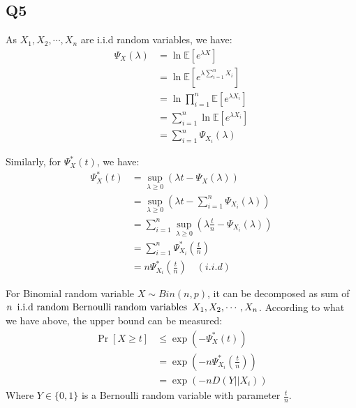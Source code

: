 \documentclass[a4paper, 12pt, titlepage]{article}
\begin{document}
\subsection{Q5}
As $X_1, X_2, \cdots, X_n$ are i.i.d random variables, we have:
\begin{equation}
    \begin{aligned}
        \Psi_{X}(\lambda) &= \ln \mathbb E \left[ e^{\lambda X} \right] \\
                           &= \ln \mathbb E \left[ e^{\lambda \sum_{i = 1}^{n} X_{i}} \right] \\
                           &= \ln \prod_{i = 1}^{n} \mathbb E \left[ e^{\lambda X_{i} } \right] \\
                           &= \sum_{i = 1}^{n} \ln \mathbb E \left[ e^{\lambda X_{i} } \right] \\
                           &= \sum_{i = 1}^{n} \Psi_{X_{i}}(\lambda)
    \end{aligned}
\end{equation}

Similarly, for $\Psi_{X}^{*}(t)$, we have:
\begin{equation}
    \begin{aligned}
        \Psi_{X}^{*}(t) &= \sup_{\lambda \geq 0} \left( \lambda t - \Psi_{X}(\lambda) \right) \\
                        &= \sup_{\lambda \geq 0} \left( \lambda t - \sum_{i = 1}^{n} \Psi_{X_{i}}(\lambda) \right) \\
                        &= \sum_{i = 1}^{n} \sup_{\lambda \geq 0} \left( \lambda \frac{t}{n} - \Psi_{X_{i}}(\lambda) \right) \\
                        &= \sum_{i = 1}^{n} \Psi_{X_{i}}^{*}(\frac{t}{n}) \\
                        &= n \Psi_{X_{i}}^{*}(\frac{t}{n}) \quad (i.i.d)
    \end{aligned}
\end{equation}

For Binomial random variable $X \sim Bin(n, p)$, it can be decomposed as sum of $ n \text{\, i.i.d random Bernoulli random variables\, } X_{1}, X_{2}, \cdots, X_{n} $.
According to what we have above, the upper bound can be measured:
\begin{equation}
    \begin{aligned}
        \Pr \left[ X \geq t \right] &\leq \exp \left( - \Psi_{X}^{*}(t) \right) \\
                                    &= \exp \left( - n \Psi_{X_{i}}^{*}(\frac{t}{n}) \right) \\
                                    &= \exp \left( - n D(Y || X_{i}) \right)  
    \end{aligned}
\end{equation}
Where $Y \in \{ 0, 1 \}$ is a Bernoulli random variable with parameter $ \frac{t}{n} $.
\end{document}
